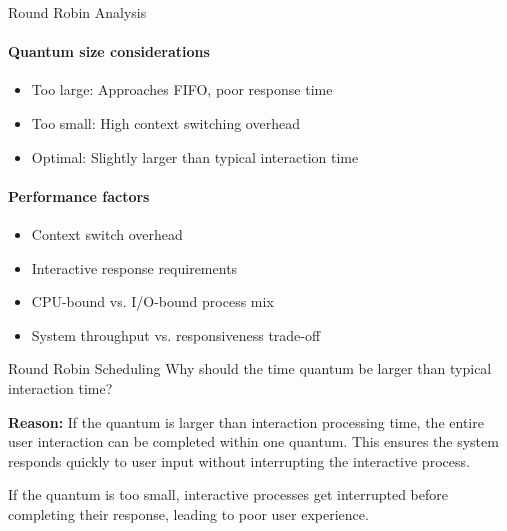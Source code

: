 \begin{KR}{Round Robin Analysis}
    \paragraph{Quantum size considerations}
    \begin{itemize}
        \item Too large: Approaches FIFO, poor response time
        \item Too small: High context switching overhead
        \item Optimal: Slightly larger than typical interaction time
    \end{itemize}
    
    \paragraph{Performance factors}
    \begin{itemize}
        \item Context switch overhead
        \item Interactive response requirements
        \item CPU-bound vs. I/O-bound process mix
        \item System throughput vs. responsiveness trade-off
    \end{itemize}
\end{KR}

\begin{example2}{Round Robin Scheduling}
    Why should the time quantum be larger than typical interaction time?
    
    \textbf{Reason:}
    If the quantum is larger than interaction processing time, the entire user interaction can be completed within one quantum. This ensures the system responds quickly to user input without interrupting the interactive process.
    
    If the quantum is too small, interactive processes get interrupted before completing their response, leading to poor user experience.
\end{example2}

\multend


